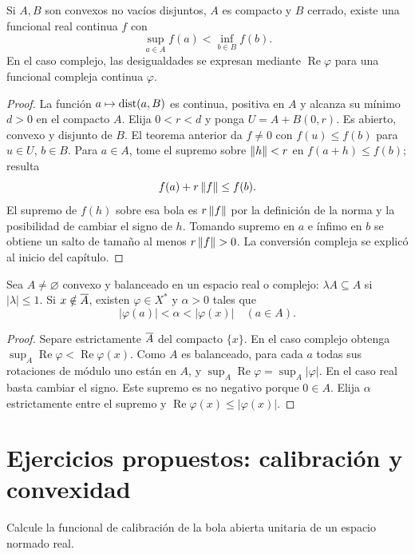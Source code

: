 \begin{teorema}\label{v3:separacion-estricta}
Si $A,B$ son convexos no vacíos disjuntos, $A$ es compacto y $B$ cerrado, existe una funcional real continua $f$ con
\[
 \sup_{a\in A}f(a)<\inf_{b\in B}f(b).
\]
En el caso complejo, las desigualdades se expresan mediante $\operatorname{Re}\varphi$ para una funcional compleja continua $\varphi$.
\end{teorema}
\begin{proof}
La función $a\mapsto\operatorname{dist}(a,B)$ es continua, positiva en $A$ y alcanza su mínimo $d>0$ en el compacto $A$. Elija $0<r<d$ y ponga $U=A+B(0,r)$. Es abierto, convexo y disjunto de $B$. El teorema anterior da $f\ne0$ con $f(u)\leq f(b)$ para $u\in U$, $b\in B$. Para $a\in A$, tome el supremo sobre $\left\lVert h\right\rVert<r$ en $f(a+h)\leq f(b)$; resulta
\[
 f(a)+r\left\lVert f\right\rVert\leq f(b).
\]
El supremo de $f(h)$ sobre esa bola es $r\left\lVert f\right\rVert$ por la definición de la norma y la posibilidad de cambiar el signo de $h$. Tomando supremo en $a$ e ínfimo en $b$ se obtiene un salto de tamaño al menos $r\left\lVert f\right\rVert>0$. La conversión compleja se explicó al inicio del capítulo.
\end{proof}
\begin{corolario}\label{v3:separacion-balanceada}
Sea $A\ne\varnothing$ convexo y balanceado en un espacio real o complejo: $\lambda A\subseteq A$ si $|\lambda|\leq1$. Si $x\notin\overline{A}$, existen $\varphi\in X^*$ y $\alpha>0$ tales que
\[
 |\varphi(a)|<\alpha<|\varphi(x)|\quad(a\in A).
\]
\end{corolario}
\begin{proof}
Separe estrictamente $\overline{A}$ del compacto $\{x\}$. En el caso complejo obtenga $\sup_A\operatorname{Re}\varphi<\operatorname{Re}\varphi(x)$. Como $A$ es balanceado, para cada $a$ todas sus rotaciones de módulo uno están en $A$, y $\sup_A\operatorname{Re}\varphi=\sup_A|\varphi|$. En el caso real basta cambiar el signo. Este supremo es no negativo porque $0\in A$. Elija $\alpha$ estrictamente entre el supremo y $\operatorname{Re}\varphi(x)\leq|\varphi(x)|$.
\end{proof}

\section{Ejercicios propuestos: calibración y convexidad}
\begin{ejercicio}\label{ej:v3-l05-1}
Calcule la funcional de calibración de la bola abierta unitaria de un espacio normado real.
\end{ejercicio}

